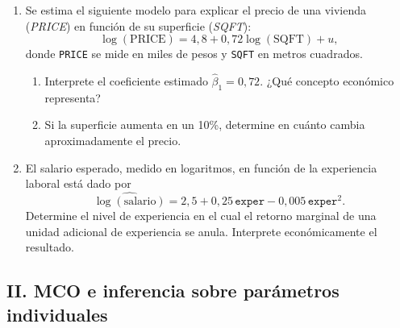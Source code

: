 \documentclass[letterpaper,11pt]{article}
\begin{document}
\begin{enumerate}

\item Se estima el siguiente modelo para explicar el precio de una vivienda
    (\emph{PRICE}) en función de su superficie (\emph{SQFT}):
    \[
        \log(\text{PRICE})
        = 4{,}8 + 0{,}72\log(\text{SQFT}) + u,
    \]
    donde \texttt{PRICE} se mide en miles de pesos y \texttt{SQFT} en metros
    cuadrados.
    \begin{enumerate}[label=(\alph*)]
        \item Interprete el coeficiente estimado $\hat\beta_1=0{,}72$.
              ¿Qué concepto económico representa?
        \item Si la superficie aumenta en un 10\%, determine en cuánto cambia
              aproximadamente el precio.
    \end{enumerate}

\item El salario esperado, medido en logaritmos, en función de la experiencia
    laboral está dado por
    \[
        \widehat{\log(\text{salario})}
        = 2{,}5 + 0{,}25\,\texttt{exper}
        - 0{,}005\,\texttt{exper}^{2}.
    \]
    Determine el nivel de experiencia en el cual el retorno marginal de una
    unidad adicional de experiencia se anula. Interprete económicamente el
    resultado.

\end{enumerate}

\subsection*{II. MCO e inferencia sobre parámetros individuales}
\end{document}
